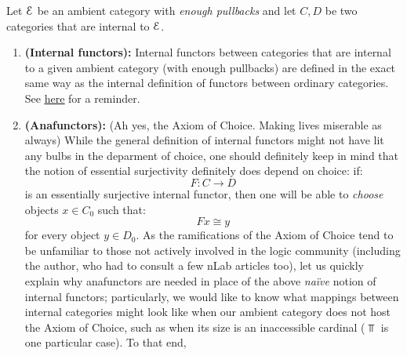             \begin{definition} \label{def: internal_functors}
                Let $\mathcal{E}$ be an ambient category with \textit{enough pullbacks} and let $C, D$ be two categories that are internal to $\mathcal{E}$.
                    \begin{enumerate}
                        \item \textbf{(Internal functors):} Internal functors between categories that are internal to a given ambient category (with enough pullbacks) are defined in the exact same way as the internal definition of functors between ordinary categories. See \href{https://ncatlab.org/nlab/show/functor#InternalDefinition}{\underline{here}} for a reminder.
                        \item \textbf{(Anafunctors):} (Ah yes, the Axiom of Choice. Making lives miserable as always) While the general definition of internal functors might not have lit any bulbs in the deparment of choice, one should definitely keep in mind that the notion of essential surjectivity definitely does depend on choice: if:
                            $$F: C \to D$$
                        is an essentially surjective internal functor, then one will be able to \textit{choose} objects $x \in C_0$ such that:
                            $$Fx \cong y$$
                        for every object $y \in D_0$. As the ramifications of the Axiom of Choice tend to be unfamiliar to those not actively involved in the logic community (including the author, who had to consult a few nLab articles too), let us quickly explain why anafunctors are needed in place of the above \textit{na\"ive} notion of internal functors; particularly, we would like to know what mappings between internal categories might look like when our ambient category does not host the Axiom of Choice, such as when its size is an inaccessible cardinal ($\Top$ is one particular case). To that end, 
                        

\end{enumerate}
\end{definition}
